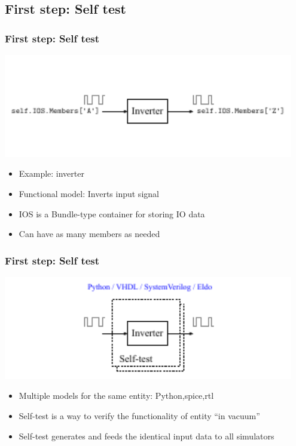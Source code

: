 \documentclass{sdkslides}
\begin{document}

\renewcommand{\sectionname}{First step: Self test }
\subsection*{\sectionname}
\begin{frame}[t]
    \frametitle{\sectionname}
    \begin{center}
        \includegraphics[width=0.95\textwidth]{Pics/inverter_single_1}
    \end{center}
    \begin{itemize}
        \item Example: inverter
        \item Functional model: Inverts input signal
        \item IOS is a Bundle-type container for storing IO data
        \item Can have as many members as needed
    \end{itemize}
\end{frame}

\begin{frame}[t]
    \frametitle{\sectionname}
    \begin{center}
        \includegraphics[width=0.95\textwidth]{Pics/inverter_single_2}
    \end{center}
    \begin{itemize}
        \item Multiple models for the same entity: Python,spice,rtl
        \item Self-test is a way to verify the functionality of entity ``in
            vacuum''
        \item Self-test generates and feeds the identical input
            data to all simulators
    \end{itemize}
\end{frame}
\end{document}
